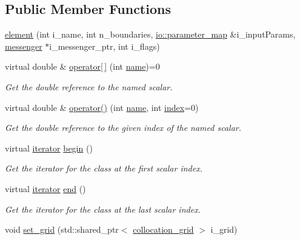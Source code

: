 \subsection*{Public Member Functions}
\begin{DoxyCompactItemize}
\item 
\hyperlink{classbases_1_1element_a06505a1d8050683b6a9a07b4b92f38f5}{element} (int i\-\_\-name, int n\-\_\-boundaries, \hyperlink{namespaceio_a1c55c654666eeece6a9724f453fdbd87}{io\-::parameter\-\_\-map} \&i\-\_\-input\-Params, \hyperlink{classbases_1_1messenger}{messenger} $\ast$i\-\_\-messenger\-\_\-ptr, int i\-\_\-flags)
\item 
virtual double \& \hyperlink{classbases_1_1element_a4ae6c42893603fc086c5c207e236f9d8}{operator\mbox{[}$\,$\mbox{]}} (int \hyperlink{classbases_1_1element_a52af85c34174ec732a3feb6a7e63fbc6}{name})=0
\begin{DoxyCompactList}\small\item\em Get the double reference to the named scalar. \end{DoxyCompactList}\item 
virtual double \& \hyperlink{classbases_1_1element_aec8a0151fcc9259e3313558a928fdf62}{operator()} (int \hyperlink{classbases_1_1element_a52af85c34174ec732a3feb6a7e63fbc6}{name}, int \hyperlink{plan_8hpp_a6784e1c334dfceb8f017667c0b0f6a3e}{index}=0)
\begin{DoxyCompactList}\small\item\em Get the double reference to the given index of the named scalar. \end{DoxyCompactList}\item 
virtual \hyperlink{classbases_1_1element_ad6c297b8fbb3ea61a1a7048f0fbf7d89}{iterator} \hyperlink{classbases_1_1element_aa323f71efe1d063f3a75fb0ae52dd4e4}{begin} ()
\begin{DoxyCompactList}\small\item\em Get the iterator for the class at the first scalar index. \end{DoxyCompactList}\item 
virtual \hyperlink{classbases_1_1element_ad6c297b8fbb3ea61a1a7048f0fbf7d89}{iterator} \hyperlink{classbases_1_1element_a56ecd5c3a4ca85b1a818c9ff0d0d0213}{end} ()
\begin{DoxyCompactList}\small\item\em Get the iterator for the class at the last scalar index. \end{DoxyCompactList}\item 
void \hyperlink{classbases_1_1element_a4db7290cae3a85a32e28a6f73457c08c}{set\-\_\-grid} (std\-::shared\-\_\-ptr$<$ \hyperlink{classbases_1_1collocation__grid}{collocation\-\_\-grid} $>$ i\-\_\-grid)

\end{DoxyCompactItemize}
